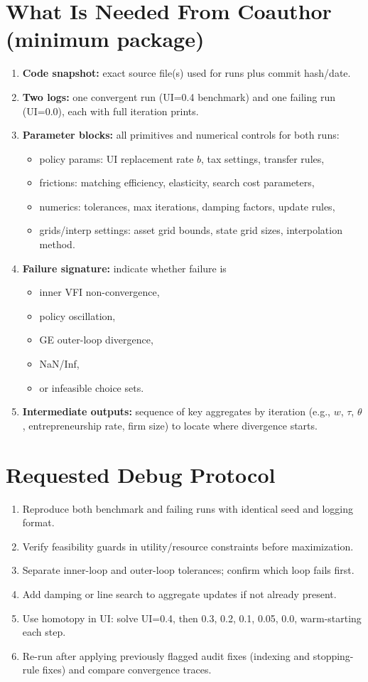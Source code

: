 \documentclass[11pt]{article}
\begin{document}
\section*{What Is Needed From Coauthor (minimum package)}
\begin{enumerate}
\item \textbf{Code snapshot:} exact source file(s) used for runs plus commit hash/date.
\item \textbf{Two logs:} one convergent run (UI=0.4 benchmark) and one failing run (UI=0.0), each with full iteration prints.
\item \textbf{Parameter blocks:} all primitives and numerical controls for both runs:
\begin{itemize}
\item policy params: UI replacement rate $b$, tax settings, transfer rules,
\item frictions: matching efficiency, elasticity, search cost parameters,
\item numerics: tolerances, max iterations, damping factors, update rules,
\item grids/interp settings: asset grid bounds, state grid sizes, interpolation method.
\end{itemize}
\item \textbf{Failure signature:} indicate whether failure is
\begin{itemize}
\item inner VFI non-convergence,
\item policy oscillation,
\item GE outer-loop divergence,
\item NaN/Inf,
\item or infeasible choice sets.
\end{itemize}
\item \textbf{Intermediate outputs:} sequence of key aggregates by iteration (e.g., $w$, $\tau$, $\theta$, entrepreneurship rate, firm size) to locate where divergence starts.
\end{enumerate}

\section*{Requested Debug Protocol}
\begin{enumerate}
\item Reproduce both benchmark and failing runs with identical seed and logging format.
\item Verify feasibility guards in utility/resource constraints before maximization.
\item Separate inner-loop and outer-loop tolerances; confirm which loop fails first.
\item Add damping or line search to aggregate updates if not already present.
\item Use homotopy in UI: solve UI=0.4, then 0.3, 0.2, 0.1, 0.05, 0.0, warm-starting each step.
\item Re-run after applying previously flagged audit fixes (indexing and stopping-rule fixes) and compare convergence traces.
\end{enumerate}
\end{document}
